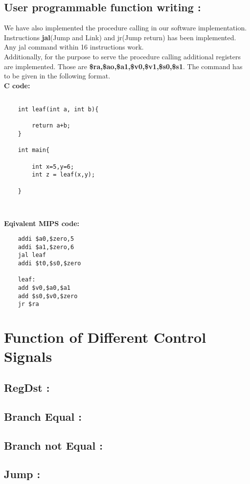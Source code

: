 \documentclass[12pt]{article}
\begin{document}
\subsection{User programmable function writing : }

We have also implemented the procedure calling in our software implementation. Instructions \textbf{jal}(Jump and Link) and jr(Jump return) has been implemented.\\
Any jal command within 16 instructions work.\\
Additionally, for the purpose to serve the procedure calling additional registers are implemented. Those are \textbf{\$ra,\$ao,\$a1,\$v0,\$v1,\$s0,\$s1}. The command has to be given in the following format.\\

\textbf{C code: }
\begin{verbatim}

    int leaf(int a, int b){

        return a+b;
    }

    int main{

        int x=5,y=6;
        int z = leaf(x,y);
        
    }
    
    
\end{verbatim}

\textbf{Eqivalent MIPS code: }
\begin{verbatim}
    addi $a0,$zero,5
    addi $a1,$zero,6
    jal leaf
    addi $t0,$s0,$zero

    leaf:
    add $v0,$a0,$a1
    add $s0,$v0,$zero
    jr $ra
\end{verbatim}
\section{Function of Different Control Signals} 

\subsection{RegDst : }
\subsection{Branch Equal : }
\subsection{Branch not Equal : }
\subsection{Jump : }
\end{document}
